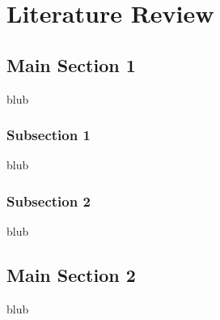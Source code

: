 
\chapter{Literature Review} %

\label{ChapterLiteratureReview} %


\section{Main Section 1}

blub


\subsection{Subsection 1}

blub



\subsection{Subsection 2}

blub



\section{Main Section 2}

blub

